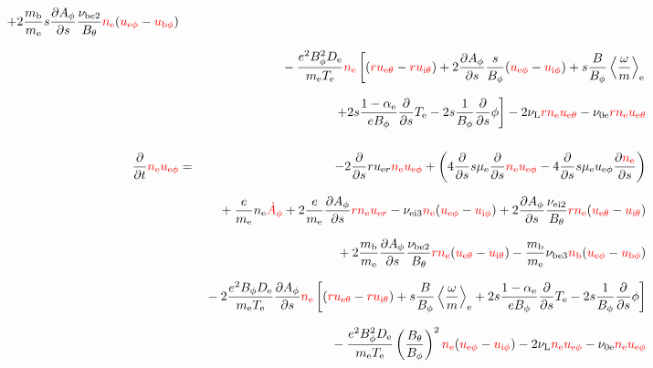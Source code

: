 \documentclass[11pt]{article}
\def\r#1{{\rm#1}}
\def\ddt{\frac{\partial}{\partial t}}
\def\dds{\frac{\partial}{\partial s}}
\def\dd#1{\frac{\partial #1}{\partial s}}
\def\ave#1{\left\langle#1\right\rangle}
\def\me{m_\r{e}}
\def\mb{m_\r{b}}
\def\mue{\mu_\r{e}}
\def\De{D_\r{e}}
\def\Di{D_\r{i}}
\def\nee{n_\r{e}}
\def\ni{n_\r{i}}
\def\nb{n_\r{b}}
\def\uer{u_{\r{e}r}}
\def\ueth{u_{\r{e}\theta}}
\def\uith{u_{\r{i}\theta}}
\def\ueph{u_{\r{e}\phi}}
\def\uiph{u_{\r{i}\phi}}
\def\ubph{u_{\r{b}\phi}}
\def\Bth{B_\theta}
\def\Bph{B_\phi}
\def\Aphd{\dot{A}_\phi}
\def\Aph{A_\phi}
\def\Te{T_\r{e}}
\def\Ti{T_\r{i}}
\def\Zi{Z_\r{i}}
\def\nune{\nu_\r{0e}}
\def\nuL{\nu_\r{L}}
\def\red#1{\textcolor{red}{#1}}
\begin{document}
\begin{eqnarray}
%
  + 2 \frac{\mb}{\me} s \dd{\Aph} \frac{\nu_\r{be2}}{\Bth} \red{\nee}
  (\red{\ueph} - \red{\ubph})
\nonumber\\[2.5mm]&&{}
%
  - \frac{e^2 \Bph^2 \De}{\me\Te}\red{\nee}
    \left[(\red{r \ueth} - \red{r \uith})+
     2\dd{\Aph}\frac{s}{\Bph}(\red{\ueph} - \red{\uiph})
     + s \frac{B}{\Bph}\ave{\frac{\omega}{m}}_\r{e}\right.
\nonumber\\[2.5mm]&&{}
%
    \left.+ 2 s \frac{1-\alpha_\r{e}}{e\Bph} \dds \Te
     - 2 s \frac{1}{\Bph} \dds \phi\right]
%
%
  - 2 \nuL \red{r \nee \ueth}
%
  - \nune \red{r \nee \ueth}
%
%
\\[5mm]
  \ddt \red{\nee \ueph} &=&
%
  - 2 \dds r \uer \red{\nee \ueph}
%
  + \left(   4 \dds s \mue \dds \red{\nee \ueph}
%
           - 4 \dds s \mue \ueph \dd{\red{\nee}} \right)
\nonumber\\[2.5mm]&&{}
%
  + \frac{e}{\me} \nee \red{\Aphd}
%
  + 2 \frac{e}{\me} \dd{\Aph} \red{r \nee \uer} 
%
  - \nu_\r{ei3} \red{\nee} (\red{\ueph} - \red{\uiph})
%
  + 2 \dd{\Aph} \frac{\nu_\r{ei2}}{\Bth} \red{r \nee} (\red{\ueth} - \red{\uith})
\nonumber\\[2.5mm]&&{}
%
  + 2 \frac{\mb}{\me} \dd{\Aph} \frac{\nu_\r{be2}}{\Bth} \red{r \nee} (\red{\ueth} - \red{\uith})
%
  - \frac{\mb}{\me} \nu_\r{be3} \red{\nb} (\red{\ueph} - \red{\ubph})
\nonumber\\[2.5mm]&&{}
%
  - 2\frac{e^2 \Bph \De}{\me\Te}\dd{\Aph}\red{\nee}
    \left[(\red{r \ueth} - \red{r \uith})
     + s \frac{B}{\Bph}\ave{\frac{\omega}{m}}_\r{e}
     + 2 s \frac{1-\alpha_\r{e}}{e\Bph} \dds \Te
     - 2 s \frac{1}{\Bph} \dds \phi \right]
\nonumber\\[2.5mm]&&{}
%
  - \frac{e^2 \Bph^2
  \De}{\me\Te}\left(\frac{\Bth}{\Bph}\right)^2\red{\nee}(\red{\ueph} - \red{\uiph})
%
%
%
  - 2 \nuL \red{\nee \ueph}
%
  - \nune \red{\nee \ueph}
%
%

\end{eqnarray}
\end{document}
